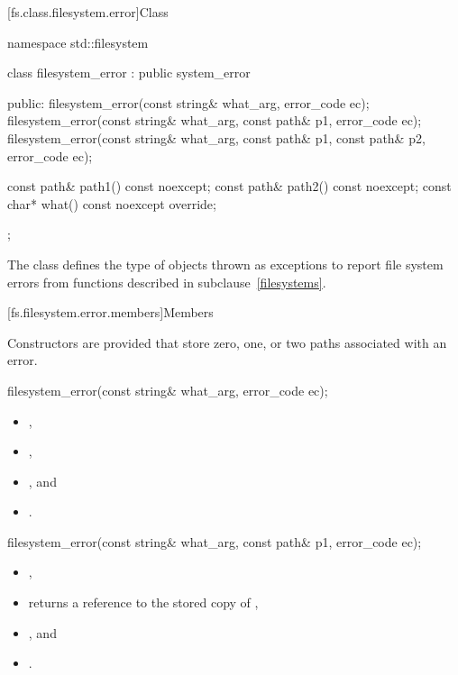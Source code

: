 [fs.class.filesystem.error]{Class }

%
\begin{codeblock}
namespace std::filesystem {
  class filesystem_error : public system_error {
  public:
    filesystem_error(const string& what_arg, error_code ec);
    filesystem_error(const string& what_arg,
                     const path& p1, error_code ec);
    filesystem_error(const string& what_arg,
                     const path& p1, const path& p2, error_code ec);

    const path& path1() const noexcept;
    const path& path2() const noexcept;
    const char* what() const noexcept override;
  };
}
\end{codeblock}
\pnum
The class  defines the type of
objects thrown as exceptions to report file system errors from functions described in
subclause~\ref{filesystems}.

[fs.filesystem.error.members]{Members}

\pnum
 Constructors are provided that store zero, one, or two paths associated with
an error.

%
\begin{itemdecl}
filesystem_error(const string& what_arg, error_code ec);
\end{itemdecl}

\begin{itemdescr}
\pnum
\ensures
\begin{itemize}
\item {},
\item {},
\item {}, and
\item {} .
\end{itemize}
\end{itemdescr}

%
\begin{itemdecl}
filesystem_error(const string& what_arg, const path& p1, error_code ec);
\end{itemdecl}

\begin{itemdescr}
\pnum
\ensures
\begin{itemize}
\item {},
\item {} returns a reference to the stored copy of ,
\item {}, and
\item {} .
\end{itemize}
\end{itemdescr}

